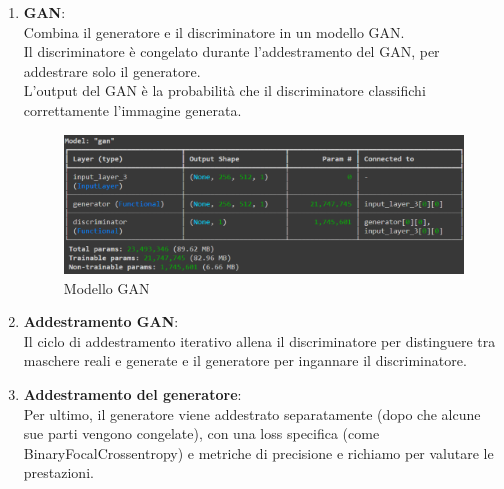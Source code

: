 \documentclass[12pt,a4paper,openright,twoside]{book}
\begin{document}
\begin{enumerate}
\item \textbf{GAN}:\\
Combina il generatore e il discriminatore in un modello GAN.\\
Il discriminatore è congelato durante l'addestramento del GAN, per addestrare solo il generatore.\\
L'output del GAN è la probabilità che il discriminatore classifichi correttamente l'immagine generata.
\begin{figure}[H]
  	\centering
    	\includegraphics[width=16cm]{figures/gan.pdf}
   	\caption{Modello GAN}
	\label{fig:gan}
\end{figure}

\item \textbf{Addestramento GAN}:\\
Il ciclo di addestramento iterativo allena il discriminatore per distinguere tra maschere reali e generate e il generatore per ingannare il discriminatore.\\

\item \textbf{Addestramento del generatore}:\\
Per ultimo, il generatore viene addestrato separatamente (dopo che alcune sue parti vengono congelate), con una loss specifica (come BinaryFocalCrossentropy) e metriche di precisione e richiamo per valutare le prestazioni.
\end{enumerate}
\end{document}
